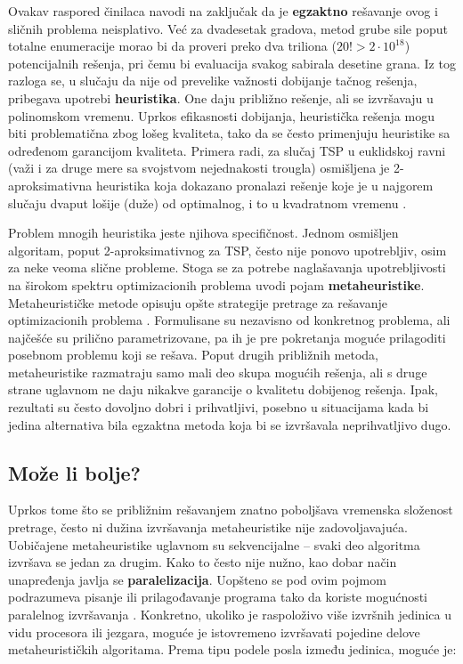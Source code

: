 \documentclass[a4paper]{article}
\begin{document}
Ovakav raspored činilaca navodi na zaključak da je \textbf{egzaktno} rešavanje ovog i sličnih problema neisplativo. Već za dvadesetak gradova, metod grube sile poput totalne enumeracije morao bi da proveri preko dva triliona ($20! > 2\cdot10^{18}$) potencijalnih rešenja, pri čemu bi evaluacija svakog sabirala desetine grana. Iz tog razloga se, u slučaju da nije od prevelike važnosti dobijanje tačnog rešenja, pribegava upotrebi \textbf{heuristika}. One daju približno rešenje, ali se izvršavaju u polinomskom vremenu. Uprkos efikasnosti dobijanja, heuristička rešenja mogu biti problematična zbog lošeg kvaliteta, tako da se često primenjuju heuristike sa određenom garancijom kvaliteta. Primera radi, za slučaj TSP u euklidskoj ravni (važi i za druge mere sa svojstvom nejednakosti trougla) osmišljena je 2-aproksimativna heuristika \cite{ri} koja dokazano pronalazi rešenje koje je u najgorem slučaju dvaput lošije (duže) od optimalnog, i to u kvadratnom vremenu \cite{aa}.

Problem mnogih heuristika jeste njihova specifičnost. Jednom osmišljen algoritam, poput 2-aproksimativnog za TSP, često nije ponovo upotrebljiv, osim za neke veoma slične probleme. Stoga se za potrebe naglašavanja upotrebljivosti na širokom spektru optimizacionih problema uvodi pojam \textbf{metaheuristike}. Metaheurističke metode opisuju opšte strategije pretrage za rešavanje optimizacionih problema \cite{vi}. Formulisane su nezavisno od konkretnog problema, ali najčešće su prilično parametrizovane, pa ih je pre pokretanja moguće prilagoditi posebnom problemu koji se rešava. Poput drugih približnih metoda, metaheuristike razmatraju samo mali deo skupa mogućih rešenja, ali s druge strane uglavnom ne daju nikakve garancije o kvalitetu dobijenog rešenja. Ipak, rezultati su često dovoljno dobri i prihvatljivi, posebno u situacijama kada bi jedina alternativa bila egzaktna metoda koja bi se izvršavala neprihvatljivo dugo.

\subsection{Može li bolje?}

Uprkos tome što se približnim rešavanjem znatno poboljšava vremenska složenost pretrage, često ni dužina izvršavanja metaheuristike nije zadovoljavajuća. Uobičajene metaheuristike uglavnom su sekvencijalne -- svaki deo algoritma izvršava se jedan za drugim. Kako to često nije nužno, kao dobar način unapređenja javlja se \textbf{paralelizacija}. Uopšteno se pod ovim pojmom podrazumeva pisanje ili prilagođavanje programa tako da koriste mogućnosti paralelnog izvršavanja \cite{rs}. Konkretno, ukoliko je raspoloživo više izvršnih jedinica u vidu procesora ili jezgara, moguće je istovremeno izvršavati pojedine delove metaheurističkih algoritama. Prema tipu podele posla između jedinica, moguće je:
\end{document}
